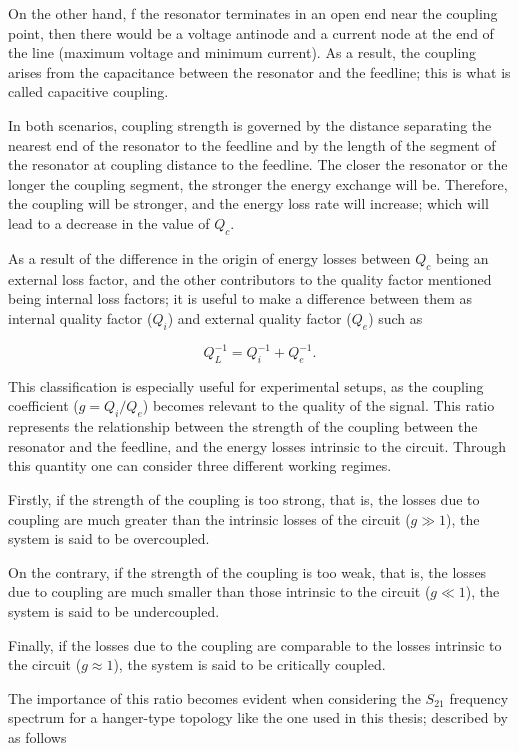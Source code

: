 \documentclass[12pt, a4paper]{article}
\begin{document}
On the other hand, f the resonator terminates in an open end near the coupling point, then there would be a voltage antinode and a current node at the end of the line (maximum voltage and minimum current). As a result, the coupling arises from the capacitance between the resonator and the feedline; this is what is called capacitive coupling.

In both scenarios, coupling strength is governed by the distance separating the nearest end of the resonator to the feedline and by the length of the segment of the resonator at coupling distance to the feedline. The closer the resonator or the longer the coupling segment, the stronger the energy exchange will be. Therefore, the coupling will be stronger, and the energy loss rate will increase; which will lead to a decrease in the value of $Q_c$.

As a result of the difference in the origin of energy losses between $Q_c$ being an external loss factor, and the other contributors to the quality factor mentioned being internal loss factors; it is useful to make a difference between them as internal quality factor ($Q_i$) and external quality factor ($Q_e$) such as

\begin{equation}
    \label{Q_e}
    Q^{-1}_{L} = Q^{-1}_{i} + Q^{-1}_{e}.
\end{equation}

This classification is especially useful for experimental setups, as the coupling coefficient ($g = Q_i / Q_e$) becomes relevant to the quality of the signal. This ratio represents the relationship between the strength of the coupling between the resonator and the feedline, and the energy losses intrinsic to the circuit. Through this quantity one can consider three different working regimes. 

Firstly, if the strength of the coupling is too strong, that is, the losses due to coupling are much greater than the intrinsic losses of the circuit ($g \gg 1$), the system is said to be overcoupled.

On the contrary, if the strength of the coupling is too weak, that is, the losses due to coupling are much smaller than those intrinsic to the circuit ($g \ll 1$), the system is said to be undercoupled.

Finally, if the losses due to the coupling are comparable to the losses intrinsic to the circuit ($g \approx 1$), the system is said to be critically coupled.

The importance of this ratio becomes evident when considering the $S_{21}$ frequency spectrum for a hanger-type topology like the one used in this thesis; described by \cite{Gao2008} as follows 
\end{document}
